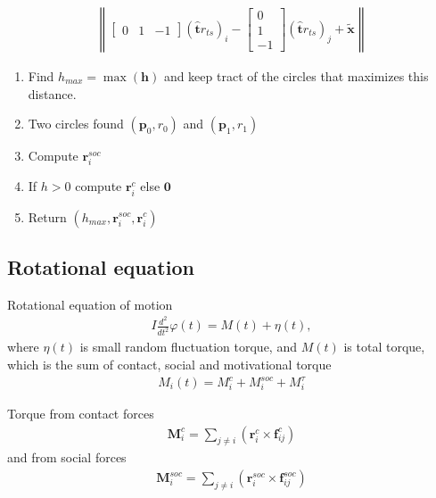 \begin{align}
\left\|\begin{bmatrix} 0 & 1 & -1 \end{bmatrix} \left(\hat{\mathbf{t}} r_{ts}\right)_{i} - \begin{bmatrix} 0 \\ 1 \\ -1 \end{bmatrix} \left(\hat{\mathbf{t}} r_{ts}\right)_{j}  + \tilde{\mathbf{x}} \right\|
\end{align}

\begin{enumerate}
\item Find $ h_{max} = \max(\mathbf{h}) $ and keep tract of the circles that maximizes this distance.

\item Two circles found $ (\mathbf{p}_{0}, r_{0}) $ and $ (\mathbf{p}_{1}, r_{1}) $

\item Compute $ \mathbf{r}_{i}^{soc} $

\item If $ h > 0 $ compute $ \mathbf{r}_{i}^{c} $ else $ \mathbf{0} $

\item Return $ (h_{max}, \mathbf{r}_{i}^{soc}, \mathbf{r}_{i}^{c}) $
\end{enumerate}

\subsection{Rotational equation}

Rotational equation of motion 
\begin{align}
I \frac{d^{2}}{d t^{2}} \varphi(t) = M(t) + \eta(t),
\end{align}
where $ \eta(t) $ is small random fluctuation torque, and $ M(t) $ is total torque, which is the sum of contact, social and motivational torque
\begin{align}
M_{i}(t) = M_{i}^{c} + M_{i}^{soc} + M_{i}^{\tau}
\end{align}

Torque from contact forces
\begin{align}
\mathbf{M}_{i}^{c} = \sum_{j\neq i}^{} \left(\mathbf{r}_{i}^{c} \times \mathbf{f}_{ij}^{c}\right)
\end{align}
and from social forces
\begin{align}
\mathbf{M}_{i}^{soc} = \sum_{j\neq i}^{} \left(\mathbf{r}_{i}^{soc} \times \mathbf{f}_{ij}^{soc}\right)
\end{align}

